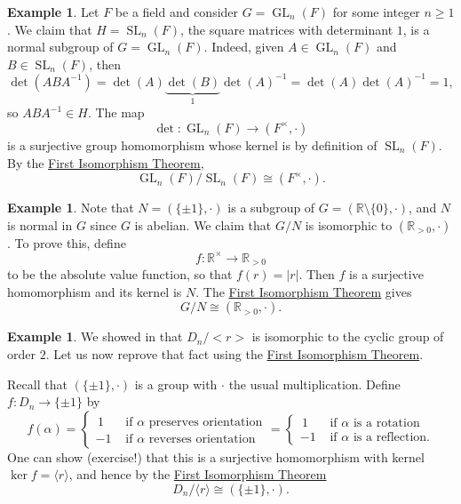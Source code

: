 \documentclass[12pt]{report}
\numberwithin{equation}{section}
\numberwithin{theorem}{chapter}
\theoremstyle{definition}
\newtheorem{example}[theorem]{Example}
\newtheorem*{basic properties}{Basic Properties}
\newtheorem*{Important Remark}{Important Remark}
\DeclareMathOperator{\GL}{GL}
\DeclareMathOperator{\SL}{SL}
\newcommand{\R}{\mathbb{R}}
\renewcommand{\ker}{\operatorname{ker}}
\begin{document}
\begin{example}\label{SLn is normal}
Let $F$ be a field and consider $G = \GL_n(F)$ for some integer $n \geqslant 1$. 
We claim that $H = \SL_n(F)$, the square matrices with determinant $1$, is a normal subgroup of $G = \GL_n(F)$. Indeed, given $A \in \GL_n(F)$ and $B \in \SL_n(F)$, then
$$\det(ABA^{-1}) = \det(A) \underset{1}{\underbrace{\det(B)}} \det(A)^{-1} = \det(A) \det(A)^{-1} = 1,$$ 
so $ABA^{-1} \in H$. %
The map 
$$\det\!: \GL_n(F) \to (F^\times, \cdot)$$ 
is a surjective group homomorphism whose kernel is by definition of $\SL_n(F)$. By the \hyperref[first iso thm]{First Isomorphism Theorem}, 
$$\GL_n(F)/\SL_n(F) \cong (F^\times, \cdot).$$ 
\end{example}



\begin{example} 
Note that $N = (\{\pm 1 \}, \cdot)$ is a subgroup of $G = (\R \setminus \{0\}, \cdot)$, and $N$ is normal in $G$ since $G$ is abelian. We claim that $G/N$ is isomorphic to $(\R_{>0}, \cdot)$. To prove this, define 
$$f\!: \R^\times \to \R_{>0}$$ 
to be the absolute value function, so that $f(r) = |r|$.
Then $f$ is a surjective homomorphism and its kernel is $N$. The \hyperref[first iso thm]{First Isomorphism Theorem} gives
$$G/N \cong (\R_{>0}, \cdot).$$
\end{example}


\begin{example} 
We showed in  that $D_n/<r>$ is isomorphic to the cyclic group of order $2$. Let us now reprove that fact using the \hyperref[first iso thm]{First Isomorphism Theorem}.

Recall that $(\{\pm 1\}, \cdot)$ is a group with $\cdot$ the usual multiplication. Define $f\!: D_{n} \longrightarrow \{\pm 1\}$ by 
$$f(\alpha) = \begin{cases}
	\, 1 & \textrm{ if $\alpha$ preserves orientation} \\
	-1 & \textrm{ if $\alpha$ reverses orientation} 
\end{cases}
=
\begin{cases}
	\, 1 & \textrm{ if $\alpha$ is a rotation} \\
	-1 & \textrm{ if $\alpha$ is a reflection}. 
\end{cases}$$
One can show (exercise!) that this is a surjective homomorphism with kernel $\ker f = \langle r \rangle$, and hence by the \hyperref[first iso thm]{First Isomorphism Theorem}
$$D_{n}/\langle r \rangle \cong (\{\pm 1\}, \cdot).$$
\end{example}
\end{document}
